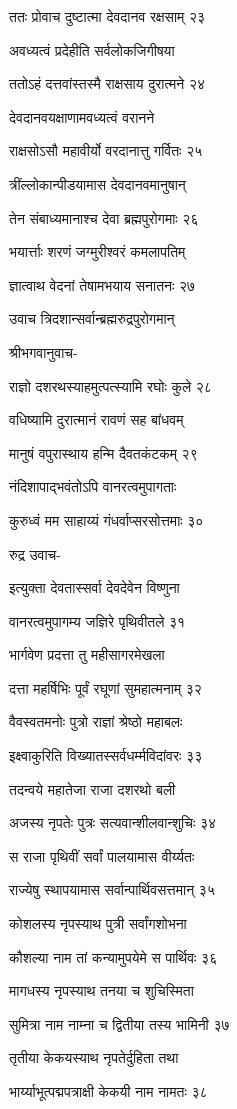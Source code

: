 ततः प्रोवाच दुष्टात्मा देवदानव रक्षसाम् २३

अवध्यत्वं प्रदेहीति सर्वलोकजिगीषया

ततोऽहं दत्तवांस्तस्मै राक्षसाय दुरात्मने २४

देवदानवयक्षाणामवध्यत्वं वरानने

राक्षसोऽसौ महावीर्यो वरदानात्तु गर्वितः २५

त्रींल्लोकान्पीडयामास देवदानवमानुषान्

तेन संबाध्यमानाश्च देवा ब्रह्मपुरोगमाः २६

भयार्त्ताः शरणं जग्मुरीश्वरं कमलापतिम्

ज्ञात्वाथ वेदनां तेषामभयाय सनातनः २७

उवाच त्रिदशान्सर्वान्ब्रह्मरुद्रपुरोगमान्

श्रीभगवानुवाच-

राज्ञो दशरथस्याहमुत्पत्स्यामि रघोः कुले २८

वधिष्यामि दुरात्मानं रावणं सह बांधवम्

मानुषं वपुरास्थाय हन्मि दैवतकंटकम् २९

नंदिशापाद्भवंतोऽपि वानरत्वमुपागताः

कुरुध्वं मम साहाय्यं गंधर्वाप्सरसोत्तमाः ३०

रुद्र उवाच-

इत्युक्ता देवतास्सर्वा देवदेवेन विष्णुना

वानरत्वमुपागम्य जज्ञिरे पृथिवीतले ३१

भार्गवेण प्रदत्ता तु महीसागरमेखला

दत्ता महर्षिभिः पूर्वं रघूणां सुमहात्मनाम् ३२

वैवस्वतमनोः पुत्रो राज्ञां श्रेष्ठो महाबलः

इक्ष्वाकुरिति विख्यातस्सर्वधर्म्मविदांवरः ३३

तदन्वये महातेजा राजा दशरथो बली

अजस्य नृपतेः पुत्रः सत्यवान्शीलवान्शुचिः ३४

स राजा पृथिवीं सर्वां पालयामास वीर्य्यतः

राज्येषु स्थापयामास सर्वान्पार्थिवसत्तमान् ३५

कोशलस्य नृपस्याथ पुत्री सर्वांगशोभना

कौशल्या नाम तां कन्यामुपयेमे स पार्थिवः ३६

मागधस्य नृपस्याथ तनया च शुचिस्मिता

सुमित्रा नाम नाम्ना च द्वितीया तस्य भामिनी ३७

तृतीया केकयस्याथ नृपतेर्दुहिता तथा

भार्य्याभूत्पद्मपत्राक्षी केकयी नाम नामतः ३८

